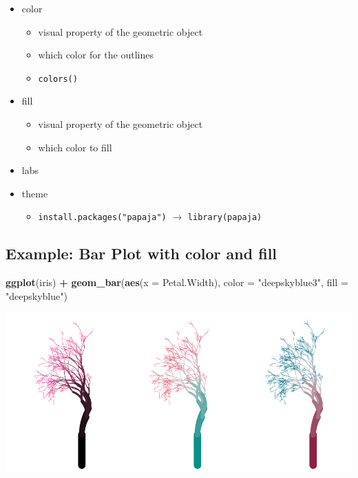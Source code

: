 \documentclass[
]{book}
\newenvironment{Shaded}{\begin{snugshade}}{\end{snugshade}}
\newcommand{\AttributeTok}[1]{\textcolor[rgb]{0.13,0.29,0.53}{#1}}
\newcommand{\FunctionTok}[1]{\textcolor[rgb]{0.13,0.29,0.53}{\textbf{#1}}}
\newcommand{\NormalTok}[1]{#1}
\newcommand{\SpecialCharTok}[1]{\textcolor[rgb]{0.81,0.36,0.00}{\textbf{#1}}}
\newcommand{\StringTok}[1]{\textcolor[rgb]{0.31,0.60,0.02}{#1}}
\providecommand{\tightlist}{%
  \setlength{\itemsep}{0pt}\setlength{\parskip}{0pt}}
\begin{document}
\begin{itemize}
\tightlist
\item
  color

  \begin{itemize}
  \tightlist
  \item
    visual property of the geometric object
  \item
    which color for the outlines
  \item
    \texttt{colors()}
  \end{itemize}
\item
  fill

  \begin{itemize}
  \tightlist
  \item
    visual property of the geometric object
  \item
    which color to fill
  \end{itemize}
\item
  labs
\item
  theme

  \begin{itemize}
  \tightlist
  \item
    \texttt{install.packages("papaja")} \(\rightarrow\) \texttt{library(papaja)}
  \end{itemize}
\end{itemize}

\subsection{Example: Bar Plot with color and fill}\label{example-bar-plot-with-color-and-fill}

\begin{Shaded}
\begin{Highlighting}[]
\FunctionTok{ggplot}\NormalTok{(iris) }\SpecialCharTok{+} 
  \FunctionTok{geom\_bar}\NormalTok{(}\FunctionTok{aes}\NormalTok{(}\AttributeTok{x =}\NormalTok{ Petal.Width), }\AttributeTok{color =} \StringTok{"deepskyblue3"}\NormalTok{, }\AttributeTok{fill =} \StringTok{"deepskyblue"}\NormalTok{)}
\end{Highlighting}
\end{Shaded}

\begin{flushleft}\includegraphics{_main_files/figure-latex/unnamed-chunk-45-1} \end{flushleft}
\end{document}
